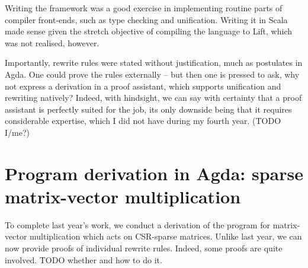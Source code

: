 \documentclass[bsc,frontabs,twoside,singlespacing,parskip,deptreport]{infthesis}
\theoremstyle{definition}
\begin{document}
Writing the framework was a good exercise in implementing routine
parts of compiler front-ends, such as type checking and
unification. Writing it in Scala made sense given the stretch
objective of compiling the language to Lift, which was not realised,
however.

Importantly, rewrite rules were stated without justification, much as
postulates in Agda. One could prove the rules externally – but then
one is pressed to ask, why not express a derivation in a proof
assistant, which supports unification and rewriting natively? Indeed,
with hindsight, we can say with certainty that a proof assistant is
perfectly suited for the job, its only downside being that it requires
considerable expertise, which I did not have during my fourth
year. (TODO I/me?)

\section{Program derivation in Agda: sparse matrix-vector
  multiplication}
\label{sec:progr-deriv-agda}

To complete last year's work, we conduct a derivation of the program
for matrix-vector multiplication which acts on CSR-sparse
matrices. Unlike last year, we can now provide proofs of individual
rewrite rules. Indeed, some proofs are quite involved. TODO whether
and how to do it.



\end{document}
